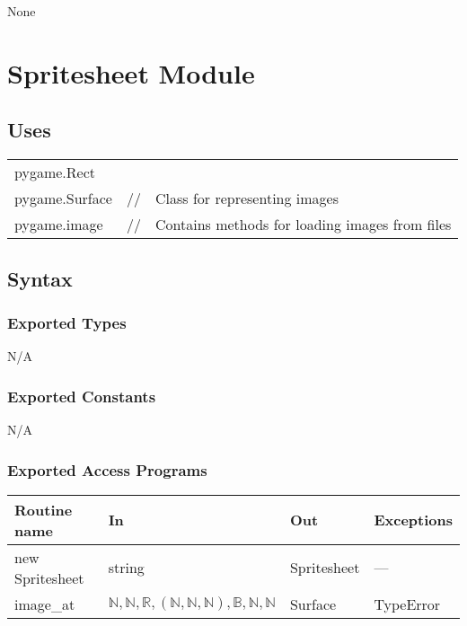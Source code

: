 \documentclass[12pt]{article}
\begin{document}
None

\newpage

\section* {Spritesheet Module}

\subsection* {Uses}

\begin{tabular}{lll}
    pygame.Rect & & \\
    pygame.Surface & // & Class for representing images\\
    pygame.image & // & Contains methods for loading images from files
\end{tabular}

\subsection* {Syntax}

\subsubsection* {Exported Types}

N/A

\subsubsection* {Exported Constants}

N/A


\subsubsection* {Exported Access Programs}

\begin{tabular}{| l | l | l | p{5cm} |}
\hline
\textbf{Routine name} & \textbf{In} & \textbf{Out} & \textbf{Exceptions}\\
\hline
new Spritesheet & string & Spritesheet & ---\\
\hline
image\_at & $\mathbb{N}, \mathbb{N}, \mathbb{R}, (\mathbb{N}, \mathbb{N}, \mathbb{N}), \mathbb{B}, \mathbb{N}, \mathbb{N}$ & Surface & TypeError\\
\hline
\end{tabular}
\end{document}
